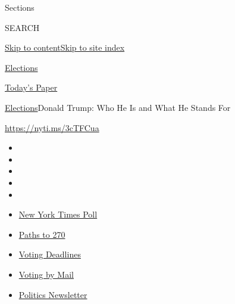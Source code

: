 Sections

SEARCH

\protect\hyperlink{site-content}{Skip to
content}\protect\hyperlink{site-index}{Skip to site index}

\href{https://www.nytimes3xbfgragh.onion/news-event/2020-election}{Elections}

\href{https://myaccount.nytimes3xbfgragh.onion/auth/login?response_type=cookie\&client_id=vi}{}

\href{https://www.nytimes3xbfgragh.onion/section/todayspaper}{Today's
Paper}

\href{/news-event/2020-election}{Elections}\textbar{}Donald Trump: Who
He Is and What He Stands For

\url{https://nyti.ms/3cTFCua}

\begin{itemize}
\item
\item
\item
\item
\item
\end{itemize}

\begin{itemize}
\item
  \href{https://www.nytimes3xbfgragh.onion/2020/09/12/us/politics/biden-trump-poll-wisconsin-minnesota.html?action=click\&pgtype=Article\&state=default\&region=TOP_BANNER\&context=storylines_menu}{New
  York Times Poll}
\item
  \href{https://www.nytimes3xbfgragh.onion/interactive/2020/us/elections/election-states-biden-trump.html?action=click\&pgtype=Article\&state=default\&region=TOP_BANNER\&context=storylines_menu}{Paths
  to 270}
\item
  \href{https://www.nytimes3xbfgragh.onion/interactive/2019/us/elections/2020-presidential-election-calendar.html?action=click\&pgtype=Article\&state=default\&region=TOP_BANNER\&context=storylines_menu}{Voting
  Deadlines}
\item
  \href{https://www.nytimes3xbfgragh.onion/interactive/2020/08/31/us/politics/vote-by-mail-deadlines.html?action=click\&pgtype=Article\&state=default\&region=TOP_BANNER\&context=storylines_menu}{Voting
  by Mail}
\item
  \href{https://www.nytimes3xbfgragh.onion/newsletters/politics?action=click\&pgtype=Article\&state=default\&region=TOP_BANNER\&context=storylines_menu}{Politics
  Newsletter}
\end{itemize}

